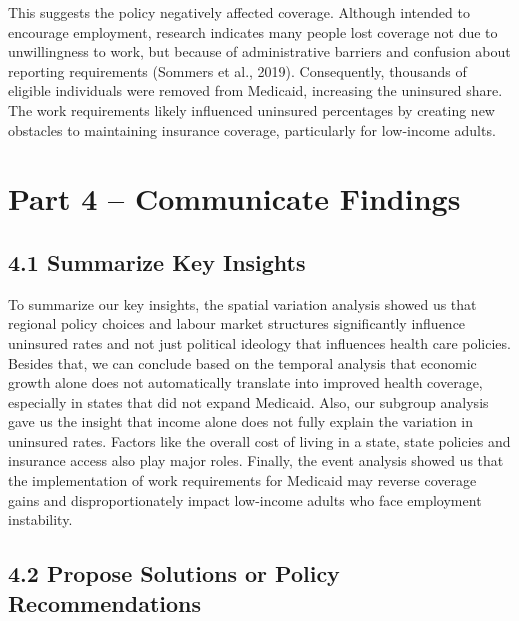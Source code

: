\documentclass[
]{article}
\begin{document}
This suggests the policy negatively affected coverage. Although intended
to encourage employment, research indicates many people lost coverage
not due to unwillingness to work, but because of administrative barriers
and confusion about reporting requirements (Sommers et al., 2019).
Consequently, thousands of eligible individuals were removed from
Medicaid, increasing the uninsured share. The work requirements likely
influenced uninsured percentages by creating new obstacles to
maintaining insurance coverage, particularly for low-income adults.

\section{Part 4 -- Communicate
Findings}\label{part-4-communicate-findings}

\subsection{4.1 Summarize Key Insights}\label{summarize-key-insights}

To summarize our key insights, the spatial variation analysis showed us
that regional policy choices and labour market structures significantly
influence uninsured rates and not just political ideology that
influences health care policies. Besides that, we can conclude based on
the temporal analysis that economic growth alone does not automatically
translate into improved health coverage, especially in states that did
not expand Medicaid. Also, our subgroup analysis gave us the insight
that income alone does not fully explain the variation in uninsured
rates. Factors like the overall cost of living in a state, state
policies and insurance access also play major roles. Finally, the event
analysis showed us that the implementation of work requirements for
Medicaid may reverse coverage gains and disproportionately impact
low-income adults who face employment instability.

\subsubsection{}\label{section}

\subsection{4.2 Propose Solutions or Policy
Recommendations}\label{propose-solutions-or-policy-recommendations}
\end{document}
